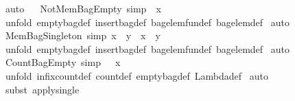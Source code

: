 \begin{isabellebody}
\ auto\isanewline
{}\isamarkupfalse%
%
\endisatagproof
{\isafoldproof}%
%
\isadelimproof
\isanewline
%
\endisadelimproof
\ \isanewline
{}\isamarkupfalse%
\ NotMemBagEmpty\ {\isacharbrackleft}simp{\isacharbrackright}{\isacharcolon}\ {\isachardoublequoteopen}{\isachartilde}\ x\ {\isacharbrackleft}{\isacharcolon}\ {\isacharpercent}{\isacharbrackleft}{\isacharpercent}{\isacharbrackright}{\isachardoublequoteclose}\isanewline
%
\isadelimproof
%
\endisadelimproof
%
\isatagproof
{}\isamarkupfalse%
\ {\isacharparenleft}unfold\ emptybag{\isacharunderscore}def\ insertbag{\isacharunderscore}def\ bagelem{\isacharunderscore}fun{\isacharunderscore}def\ bagelem{\isacharunderscore}def{\isacharparenright}\isanewline
{}\isamarkupfalse%
\ auto\isanewline
{}\isamarkupfalse%
%
\endisatagproof
{\isafoldproof}%
%
\isadelimproof
\isanewline
%
\endisadelimproof
\isanewline
{}\isamarkupfalse%
\ MemBagSingleton\ {\isacharbrackleft}simp{\isacharbrackright}{\isacharcolon}\ {\isachardoublequoteopen}{\isacharparenleft}x\ {\isacharbrackleft}{\isacharcolon}\ {\isacharpercent}{\isacharbrackleft}y{\isacharpercent}{\isacharbrackright}{\isacharparenright}\ {\isacharequal}\ {\isacharparenleft}x\ {\isacharequal}\ y{\isacharparenright}{\isachardoublequoteclose}\isanewline
%
\isadelimproof
%
\endisadelimproof
%
\isatagproof
{}\isamarkupfalse%
\ {\isacharparenleft}unfold\ emptybag{\isacharunderscore}def\ insertbag{\isacharunderscore}def\ bagelem{\isacharunderscore}fun{\isacharunderscore}def\ bagelem{\isacharunderscore}def{\isacharparenright}\isanewline
{}\isamarkupfalse%
\ auto\isanewline
{}\isamarkupfalse%
%
\endisatagproof
{\isafoldproof}%
%
\isadelimproof
\isanewline
%
\endisadelimproof
\ \isanewline
{}\isamarkupfalse%
\ CountBagEmpty\ {\isacharbrackleft}simp{\isacharbrackright}{\isacharcolon}\ {\isachardoublequoteopen}{\isacharpercent}{\isacharbrackleft}{\isacharpercent}{\isacharbrackright}\ {\isacharbrackleft}{\isacharhash}{\isacharbrackright}\ x\ {\isacharequal}\ {}{\isachardoublequoteclose}\isanewline
%
\isadelimproof
%
\endisadelimproof
%
\isatagproof
{}\isamarkupfalse%
\ {\isacharparenleft}unfold\ infixcount{\isacharunderscore}def\ count{\isacharunderscore}def\ emptybag{\isacharunderscore}def\ Lambda{\isacharunderscore}def{\isacharparenright}\isanewline
{}\isamarkupfalse%
\ auto\isanewline
{}\isamarkupfalse%
\ {\isacharparenleft}subst\ apply{\isacharunderscore}single{\isacharparenright}\isanewline

\end{isabellebody}
